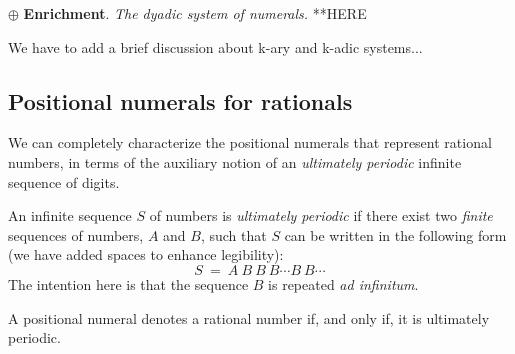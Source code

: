\bigskip

\noindent
$\oplus$ {\bf Enrichment}.  {\it The dyadic system of numerals.}
 **HERE

{\Denis We have to add a brief discussion about k-ary and k-adic systems...}


\subsection{Positional numerals for rationals}
\label{sec:special-numerals-Q}

We can completely characterize the positional numerals that represent
rational numbers, in terms of the auxiliary notion of an {\em ultimately
  periodic} infinite sequence of digits.

An infinite sequence $S$ of numbers is {\em ultimately periodic} if
there exist two {\em finite} sequences of numbers, $A$ and $B$, such
that $S$ can be written in the following form (we have added spaces to
enhance legibility):
\begin{equation}
\label{eq:ult-per-seq}
 S \ = \ A \ B \ B \ B \cdots B \ B \cdots
\end{equation}
The intention here is that the sequence $B$ is repeated {\it ad
  infinitum}.


\begin{prop}
\label{thm:rational-real}
A positional numeral denotes a rational number if, and only if, it is
ultimately periodic.
\end{prop}

